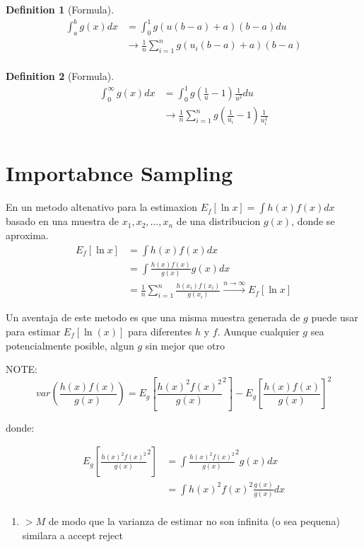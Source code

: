 \documentclass[10pt, oneside]{article}
\newtheorem{defn}{Definition}
\begin{document}
\begin{defn}[Formula]
	\[
		\begin{split}
			\int_a^b g(x) dx & = \int_0^1 g(u(b-a) + a) (b-a) du                            \\
			                 & \rightarrow \frac{1}{n} \sum_{i=1}^{n} g(u_i(b-a) + a) (b-a) \\
		\end{split}
	\]
\end{defn}

\begin{defn}[Formula]
	\[
		\begin{split}
			\int_0^\infty g(x) dx & = \int_0^1 g(\frac{1}{u} - 1) \frac{1}{u^2} du                              \\
			                      & \rightarrow \frac{1}{n} \sum_{i=1}^{n} g(\frac{1}{u_i} - 1) \frac{1}{u_i^2} \\
		\end{split}
	\]
\end{defn}

\section{Importabnce Sampling}

En un metodo altenativo para la estimaxion $E_f[\ln{x}] = \int h(x) f(x) dx$ basado en una muestra
de $x_1, x_2, \ldots, x_n$  de una distribucion $g(x)$, donde se aproxima.
\[
	\begin{split}
		E_f[\ln{x}] & = \int h(x) f(x) dx                                                                              \\
		            & = \int \frac{h(x) f(x)}{g(x)} g(x) dx                                                            \\
		            & = \frac{1}{n} \sum_{i=1}^{n} \frac{h(x_i) f(x_i)}{g(x_i)} \xrightarrow{n \to \infty} E_f[\ln{x}]
	\end{split}
\]

Un aventaja  de este metodo es que una misma muestra generada de $g$
puede usar para estimar $E_f[\ln(x)]$ para diferentes $h$ y $f$. Aunque
cualquier $g$ sea potencialmente posible, algun $g$ sin mejor que otro

NOTE:
$$
	var(\frac{h(x)f(x)}{g(x)}) = E_g[\frac{h(x)^2f(x)^2}{g(x)}^2]- E_g[\frac{h(x)f(x)}{g(x)}]^2
$$

donde:

\[
	\begin{split}
		E_g[\frac{h(x)^2f(x)^2}{g(x)}^2] & = \int \frac{h(x)^2f(x)^2}{g(x)}^2 g(x) dx \\
		                                 & = \int h(x)^2 f(x)^2 \frac{g(x)}{g(x)} dx  \\
	\end{split}
\]
\begin{enumerate}
	\item $>M$ de modo que la varianza de estimar no son infinita (o sea pequena) similara a accept reject
\end{enumerate}
\end{document}
